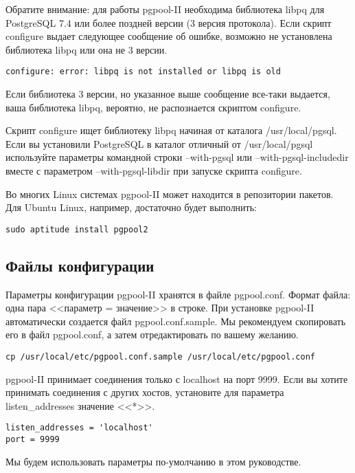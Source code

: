 Обратите внимание: для работы pgpool-II необходима библиотека libpq для PostgreSQL 7.4 или более поздней версии (3 версия протокола).
Если скрипт configure выдает следующее сообщение об ошибке, возможно не установлена библиотека libpq или она не 3 версии.
\begin{lstlisting}[label=lst:pgpool2,caption=Установка pgpool-II]
configure: error: libpq is not installed or libpq is old
\end{lstlisting}

Если библиотека 3 версии, но указанное выше сообщение все-таки выдается, ваша библиотека libpq, вероятно, 
не распознается скриптом configure.

Скрипт configure ищет библиотеку libpq начиная от каталога /usr/local/pgsql. Если вы установили PostgreSQL в каталог 
отличный от /usr/local/pgsql используйте параметры командной строки --with-pgsql или --with-pgsql-includedir вместе с 
параметром --with-pgsql-libdir при запуске скрипта configure.

Во многих Linux системах pgpool-II может находится в репозитории пакетов. 
Для Ubuntu Linux, например, достаточно будет выполнить:
\begin{lstlisting}[label=lst:pgpool3,caption=Установка pgpool-II]
sudo aptitude install pgpool2
\end{lstlisting}

\subsection{Файлы конфигурации}
Параметры конфигурации pgpool-II хранятся в файле pgpool.conf. Формат файла: одна пара <<параметр = значение>> в строке. 
При установке pgpool-II автоматически создается файл pgpool.conf.sample. Мы рекомендуем скопировать его в файл pgpool.conf, 
а затем отредактировать по вашему желанию.
\begin{lstlisting}[label=lst:pgpool4,caption=Файлы конфигурации]
cp /usr/local/etc/pgpool.conf.sample /usr/local/etc/pgpool.conf
\end{lstlisting}

pgpool-II принимает соединения только с localhost на порт 9999. Если вы хотите принимать соединения с других хостов, 
установите для параметра listen\_addresses значение <<*>>.
\begin{lstlisting}[label=lst:pgpool5,caption=Файлы конфигурации]
listen_addresses = 'localhost'
port = 9999
\end{lstlisting}

Мы будем использовать параметры по-умолчанию в этом руководстве.

